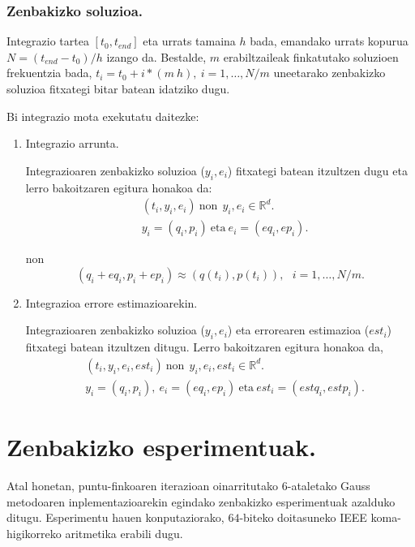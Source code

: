 \subsubsection*{Zenbakizko soluzioa.}  

Integrazio tartea $[t_0,t_{end}]$ eta urrats tamaina $h$ bada, emandako urrats kopurua $N=(t_{end}-t_0)/h$ izango da. Bestalde, $m$ erabiltzaileak finkatutako soluzioen frekuentzia bada, $t_i=t_0+i*(m \ h), \ i=1,\dots,N/m$ uneetarako zenbakizko soluzioa fitxategi bitar batean idatziko dugu.

Bi integrazio mota exekutatu daitezke:
\begin{enumerate}
\item Integrazio arrunta.

Integrazioaren zenbakizko soluzioa ($y_i,e_i$)  fitxategi batean itzultzen dugu eta  lerro bakoitzaren egitura honakoa da:
\begin{align*}
& (t_i,y_i,e_i) \ \text{non} \ \ y_i,e_i \in \mathbb{R}^d.\\
& y_i=(q_i,p_i) \ \text{eta} \ e_i=(eq_i,ep_i).
\end{align*}

non
\begin{equation*}
(q_i+eq_i,p_i+ep_i)\approx(q(t_i),p(t_i)), \ \ \ i=1,\dots,N/m.
\end{equation*}

\item Integrazioa errore estimazioarekin.

Integrazioaren zenbakizko soluzioa ($y_i,e_i$) eta errorearen estimazioa ($est_i$)  fitxategi batean itzultzen ditugu. Lerro bakoitzaren egitura honakoa da,
\begin{align*}
& (t_i,y_i,e_i,est_i) \ \text{non} \ \ y_i,e_i,est_i \in \mathbb{R}^d.\\
&  y_i=(q_i,p_i), \ e_i=(eq_i,ep_i) \ \text{eta} \ est_i=(estq_i,estp_i).
\end{align*}

\end{enumerate}


\clearpage


\section{Zenbakizko esperimentuak.}

Atal honetan, puntu-finkoaren iterazioan oinarritutako $6$-ataletako Gauss metodoaren inplementazioarekin egindako zenbakizko esperimentuak azalduko ditugu. Esperimentu hauen konputaziorako, $64$-biteko doitasuneko IEEE koma-higikorreko aritmetika erabili dugu.

